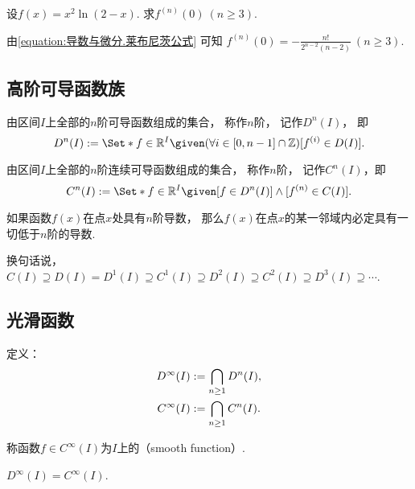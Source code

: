 \begin{example}
设\(f(x) = x^2 \ln(2-x)\).
求\(f^{(n)}(0)\ (n\geq3)\).
\begin{solution}
由\cref{equation:导数与微分.莱布尼茨公式} 可知
\(f^{(n)}(0) = -\frac{n!}{2^{n-2} (n-2)}\ (n\geq3)\).
\end{solution}
\end{example}

\subsection{高阶可导函数族}
\begin{definition}\label{definition:函数族.n阶可导函数族}
由区间\(I\)上全部的\(n\)阶可导函数组成的集合，
称作\(n\)阶，
记作\(D^n(I)\)，
即\[
	D^n(I)
	\defeq
	\Set*{
		f\in\mathbb{R}^I
		\given
		(\forall i\in[0,n-1]\cap\mathbb{Z})
		[f^{(i)} \in D(I)]
	}.
\]
\end{definition}

\begin{definition}\label{definition:函数族.n阶连续可导函数族}
由区间\(I\)上全部的\(n\)阶连续可导函数组成的集合，
称作\(n\)阶，
记作\(C^n(I)\)，即\[
	C^n(I)
	\defeq
	\Set*{
		f\in\mathbb{R}^I
		\given
		[f\in D^n(I)]
		\land
		[f^{(n)}\in C(I)]
	}.
\]
\end{definition}

\begin{theorem}
如果函数\(f(x)\)在点\(x\)处具有\(n\)阶导数，
那么\(f(x)\)在点\(x\)的某一邻域内必定具有一切低于\(n\)阶的导数.
\end{theorem}
换句话说，\(C(I) \supseteq
D(I) = D^1(I) \supseteq
C^1(I) \supseteq
D^2(I) \supseteq
C^2(I) \supseteq
D^3(I) \supseteq
\dotsb\).

\subsection{光滑函数}
\begin{definition}\label{definition:函数族.光滑函数族}
定义：\begin{gather*}
	D^\infty (I) := \bigcap_{n\geq1} D^n(I), \\
	C^\infty (I) := \bigcap_{n\geq1} C^n(I).
\end{gather*}

称函数\(f \in C^\infty (I)\)为\(I\)上的（smooth function）.
\end{definition}

\begin{property}\label{theorem:函数族.光滑函数族的性质1}
\(D^\infty (I) = C^\infty (I)\).
\end{property}
